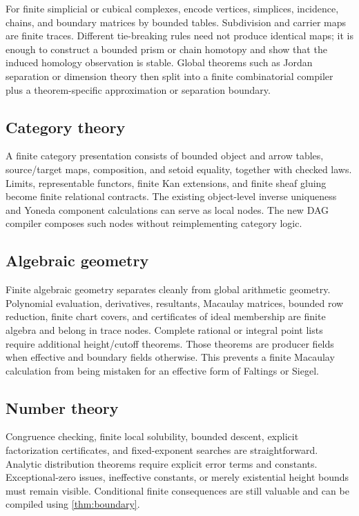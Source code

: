 \documentclass[11pt]{article}
\begin{document}
For finite simplicial or cubical complexes, encode vertices, simplices,
incidence, chains, and boundary matrices by bounded tables.  Subdivision and
carrier maps are finite traces.  Different tie-breaking rules need not produce
identical maps; it is enough to construct a bounded prism or chain homotopy and
show that the induced homology observation is stable.  Global theorems such as
Jordan separation or dimension theory then split into a finite combinatorial
compiler plus a theorem-specific approximation or separation boundary.

\subsection{Category theory}

A finite category presentation consists of bounded object and arrow tables,
source/target maps, composition, and setoid equality, together with checked
laws.  Limits, representable functors, finite Kan extensions, and finite sheaf
gluing become finite relational contracts.  The existing object-level inverse
uniqueness and Yoneda component calculations can serve as local nodes.  The new
DAG compiler composes such nodes without reimplementing category logic.

\subsection{Algebraic geometry}

Finite algebraic geometry separates cleanly from global arithmetic geometry.
Polynomial evaluation, derivatives, resultants, Macaulay matrices, bounded
row reduction, finite chart covers, and certificates of ideal membership are
finite algebra and belong in trace nodes.  Complete rational or integral point
lists require additional height/cutoff theorems.  Those theorems are producer
fields when effective and boundary fields otherwise.  This prevents a finite
Macaulay calculation from being mistaken for an effective form of Faltings or
Siegel.

\subsection{Number theory}

Congruence checking, finite local solubility, bounded descent, explicit
factorization certificates, and fixed-exponent searches are straightforward.
Analytic distribution theorems require explicit error terms and constants.
Exceptional-zero issues, ineffective constants, or merely existential height
bounds must remain visible.  Conditional finite consequences are still
valuable and can be compiled using \cref{thm:boundary}.
\end{document}
